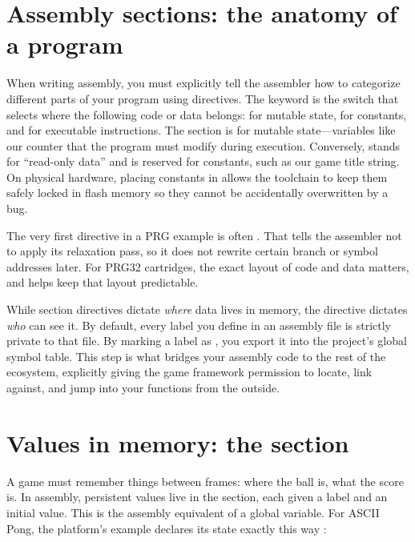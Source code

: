 \section{Assembly sections: the anatomy of a program}

When writing assembly, you must explicitly tell the assembler how to categorize different 
parts of your program using directives. The  keyword is the switch that selects 
where the following code or data belongs:  for mutable state,  for constants, 
and  for executable instructions. The  section is for mutable state—variables 
like our counter that the program must modify during execution. Conversely,  stands for 
``read-only data'' and is reserved for constants, such as our game title string. On physical hardware, 
placing constants in  allows the toolchain to keep them safely locked in flash memory so 
they cannot be accidentally overwritten by a bug.

The very first directive in a PRG example is often . That tells the assembler 
not to apply its relaxation pass, so it does not rewrite certain branch or symbol addresses later. 
For PRG32 cartridges, the exact layout of code and data matters, and  helps keep 
that layout predictable.

While section directives dictate \emph{where} data lives in memory, the  directive 
dictates \emph{who} can see it. By default, every label you define in an assembly file is strictly 
private to that file. By marking a label as , you export it into the project's global 
symbol table. This step is what bridges your assembly code to the rest of the ecosystem, explicitly 
giving the game framework permission to locate, link against, and jump into your functions from the outside.

\section{Values in memory: the  section}

A game must remember things between frames: where the ball is, what the score
is. In assembly, persistent values live in the  section, each given a
label and an initial value. This is the assembly equivalent of a global variable.
For ASCII Pong, the platform's example declares its state exactly this way
\citep{prg32repo}:

